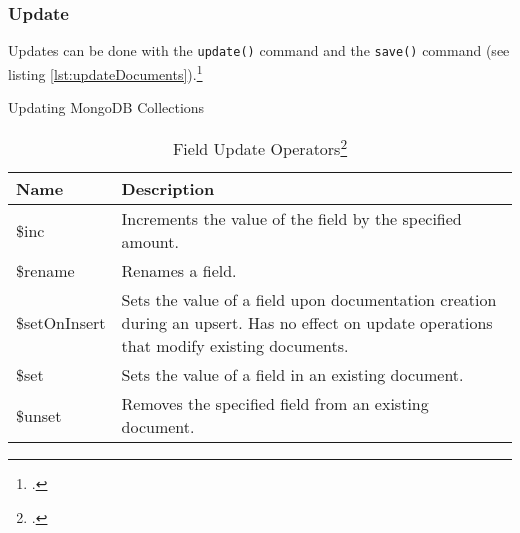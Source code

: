 \subsubsection{Update}
Updates can be done with the \texttt{update()} command and the \texttt{save()}
command (see listing \ref{lst:updateDocuments}).\footcite[Cf.][p. 75 et. sqq.]{mongo_crud_manual}

\begin{code}
	\caption{Updating MongoDB Collections}
	\label{lst:updateDocuments}
\end{code}

\begin{savenotes}
\begin{table}[htbp]
\begin{tabular*}{\textwidth}{p{} p{}}
\toprule
	\textbf{Name} 					& \textbf{Description}\\
	\midrule 
	\$inc			& Increments the value of the field by the specified amount.\\
	\$rename		& Renames a field.\\
	\$setOnInsert	& Sets the value of a field upon documentation creation during an upsert. Has no effect on update operations that modify existing documents.\\
	\$set			& Sets the value of a field in an existing document.\\
	\$unset			& Removes the specified field from an existing document.\\
\bottomrule 
\end{tabular*}
  \caption[]{Field Update Operators\footcite[][]{mongo_update}}
  \label{tab:query-selectors-compare}
\end{table}
\end{savenotes}

